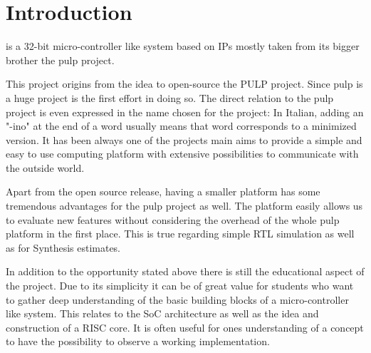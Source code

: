 
\chapter{Introduction}
\pulpino is a 32-bit micro-controller like system based on IPs mostly taken from its bigger brother the \gls{pulp} project.

This project origins from the idea to open-source the PULP project. Since \gls{pulp} is a huge project \pulpino is
the first effort in doing so. The direct relation to the \gls{pulp} project is even expressed in the name chosen for the project: In Italian, adding an "-ino" at the end of a word usually means that word corresponds to a minimized version. It has been always one of the projects main aims to provide a simple and easy to use computing platform with extensive possibilities to communicate with the outside world.

Apart from the open source release, having a smaller platform has some tremendous advantages for the \gls{pulp} project as well. The \pulpino platform easily allows us to evaluate new features without considering the overhead of the whole \gls{pulp}
platform in the first place. This is true regarding simple RTL simulation as well as for Synthesis estimates.

In addition to the opportunity stated above there is still the educational aspect of the project. Due to its simplicity it can be of great value for students who want to gather deep understanding of the basic building blocks of a micro-controller like system. This relates to the SoC architecture as well as the idea and construction of a RISC core. It is often useful for ones understanding of a concept to have the possibility to observe a working implementation.

